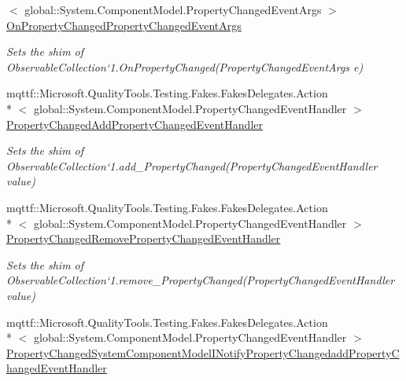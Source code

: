 \begin{DoxyCompactItemize}
$<$ global\-::\-System.\-Component\-Model.\-Property\-Changed\-Event\-Args $>$ \hyperlink{class_system_1_1_collections_1_1_object_model_1_1_fakes_1_1_shim_observable_collection_3_01_t_01_4_a1fd56d1b2dedff5152ca0a12dab14652}{On\-Property\-Changed\-Property\-Changed\-Event\-Args}
\begin{DoxyCompactList}\small\item\em Sets the shim of Observable\-Collection`1.On\-Property\-Changed(\-Property\-Changed\-Event\-Args e)\end{DoxyCompactList}\item 
mqttf\-::\-Microsoft.\-Quality\-Tools.\-Testing.\-Fakes.\-Fakes\-Delegates.\-Action\\*
$<$ global\-::\-System.\-Component\-Model.\-Property\-Changed\-Event\-Handler $>$ \hyperlink{class_system_1_1_collections_1_1_object_model_1_1_fakes_1_1_shim_observable_collection_3_01_t_01_4_af440df6337b58f0aa937f170fdf24611}{Property\-Changed\-Add\-Property\-Changed\-Event\-Handler}
\begin{DoxyCompactList}\small\item\em Sets the shim of Observable\-Collection`1.add\-\_\-\-Property\-Changed(\-Property\-Changed\-Event\-Handler value)\end{DoxyCompactList}\item 
mqttf\-::\-Microsoft.\-Quality\-Tools.\-Testing.\-Fakes.\-Fakes\-Delegates.\-Action\\*
$<$ global\-::\-System.\-Component\-Model.\-Property\-Changed\-Event\-Handler $>$ \hyperlink{class_system_1_1_collections_1_1_object_model_1_1_fakes_1_1_shim_observable_collection_3_01_t_01_4_a19082163bc731f4009f022dd167cda9a}{Property\-Changed\-Remove\-Property\-Changed\-Event\-Handler}
\begin{DoxyCompactList}\small\item\em Sets the shim of Observable\-Collection`1.remove\-\_\-\-Property\-Changed(\-Property\-Changed\-Event\-Handler value)\end{DoxyCompactList}\item 
mqttf\-::\-Microsoft.\-Quality\-Tools.\-Testing.\-Fakes.\-Fakes\-Delegates.\-Action\\*
$<$ global\-::\-System.\-Component\-Model.\-Property\-Changed\-Event\-Handler $>$ \hyperlink{class_system_1_1_collections_1_1_object_model_1_1_fakes_1_1_shim_observable_collection_3_01_t_01_4_a3a05bb45eafd5adcd754656769dcc0bb}{Property\-Changed\-System\-Component\-Model\-I\-Notify\-Property\-Changedadd\-Property\-Changed\-Event\-Handler}

\end{DoxyCompactItemize}
